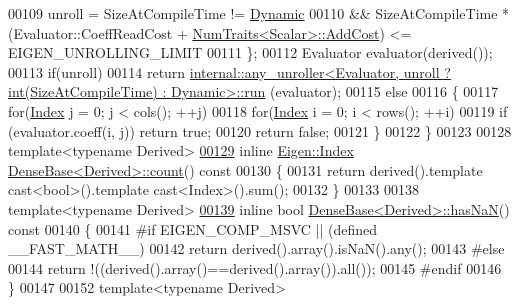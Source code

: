 \begin{DoxyCode}
00109     unroll = SizeAtCompileTime != \hyperlink{namespace_eigen_ad81fa7195215a0ce30017dfac309f0b2}{Dynamic}
00110           && SizeAtCompileTime * (Evaluator::CoeffReadCost + 
      \hyperlink{group___core___module_struct_eigen_1_1_num_traits}{NumTraits<Scalar>::AddCost}) <= EIGEN\_UNROLLING\_LIMIT
00111   \};
00112   Evaluator evaluator(derived());
00113   \textcolor{keywordflow}{if}(unroll)
00114     \textcolor{keywordflow}{return} 
      \hyperlink{struct_eigen_1_1internal_1_1any__unroller}{internal::any\_unroller<Evaluator, unroll ? int(SizeAtCompileTime) : Dynamic>::run}
      (evaluator);
00115   \textcolor{keywordflow}{else}
00116   \{
00117     \textcolor{keywordflow}{for}(\hyperlink{namespace_eigen_a62e77e0933482dafde8fe197d9a2cfde}{Index} j = 0; j < cols(); ++j)
00118       \textcolor{keywordflow}{for}(\hyperlink{namespace_eigen_a62e77e0933482dafde8fe197d9a2cfde}{Index} i = 0; i < rows(); ++i)
00119         \textcolor{keywordflow}{if} (evaluator.coeff(i, j)) \textcolor{keywordflow}{return} \textcolor{keyword}{true};
00120     \textcolor{keywordflow}{return} \textcolor{keyword}{false};
00121   \}
00122 \}
00123 
00128 \textcolor{keyword}{template}<\textcolor{keyword}{typename} Derived>
\hyperlink{group___core___module_a229be090c665b9bf7d1fcdfd1ab6e0c1}{00129} \textcolor{keyword}{inline} \hyperlink{namespace_eigen_a62e77e0933482dafde8fe197d9a2cfde}{Eigen::Index} \hyperlink{group___core___module_a229be090c665b9bf7d1fcdfd1ab6e0c1}{DenseBase<Derived>::count}()\textcolor{keyword}{ const}
00130 \textcolor{keyword}{}\{
00131   \textcolor{keywordflow}{return} derived().template cast<bool>().\textcolor{keyword}{template} cast<Index>().sum();
00132 \}
00133 
00138 \textcolor{keyword}{template}<\textcolor{keyword}{typename} Derived>
\hyperlink{group___core___module_ab13d158c900560d3e1b25d85d2d33dd6}{00139} \textcolor{keyword}{inline} \textcolor{keywordtype}{bool} \hyperlink{group___core___module_ab13d158c900560d3e1b25d85d2d33dd6}{DenseBase<Derived>::hasNaN}()\textcolor{keyword}{ const}
00140 \textcolor{keyword}{}\{
00141 \textcolor{preprocessor}{#if EIGEN\_COMP\_MSVC || (defined \_\_FAST\_MATH\_\_)}
00142   \textcolor{keywordflow}{return} derived().array().isNaN().any();
00143 \textcolor{preprocessor}{#else}
00144   \textcolor{keywordflow}{return} !((derived().array()==derived().array()).all());
00145 \textcolor{preprocessor}{#endif}
00146 \}
00147 
00152 \textcolor{keyword}{template}<\textcolor{keyword}{typename} Derived>

\end{DoxyCode}
